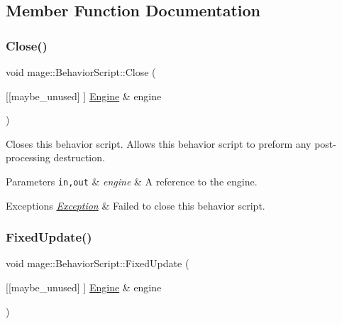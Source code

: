 \subsection{Member Function Documentation}
\mbox{\label{classmage_1_1_behavior_script_a5a8d2d38b369e193bf8cc20a74708397}} 
\subsubsection{\texorpdfstring{Close()}{Close()}}
{\footnotesize\ttfamily void mage\+::\+Behavior\+Script\+::\+Close (\begin{DoxyParamCaption}\item[{\mbox{[}\mbox{[}maybe\+\_\+unused\mbox{]} \mbox{]} \mbox{\hyperlink{classmage_1_1_engine}{Engine}} \&}]{engine }\end{DoxyParamCaption})\hspace{0.3cm}{\ttfamily [virtual]}}

Closes this behavior script. Allows this behavior script to preform any post-\/processing destruction.


\begin{DoxyParams}[1]{Parameters}
\mbox{\tt in,out}  & {\em engine} & A reference to the engine. \\
\hline
\end{DoxyParams}

\begin{DoxyExceptions}{Exceptions}
{\em \mbox{\hyperlink{classmage_1_1_exception}{Exception}}} & Failed to close this behavior script. \\
\hline
\end{DoxyExceptions}
\mbox{\label{classmage_1_1_behavior_script_ae4b9cb7f3ee9f96d69682aef42f8bb12}} 
\subsubsection{\texorpdfstring{Fixed\+Update()}{FixedUpdate()}}
{\footnotesize\ttfamily void mage\+::\+Behavior\+Script\+::\+Fixed\+Update (\begin{DoxyParamCaption}\item[{\mbox{[}\mbox{[}maybe\+\_\+unused\mbox{]} \mbox{]} \mbox{\hyperlink{classmage_1_1_engine}{Engine}} \&}]{engine }\end{DoxyParamCaption})\hspace{0.3cm}{\ttfamily [virtual]}}

